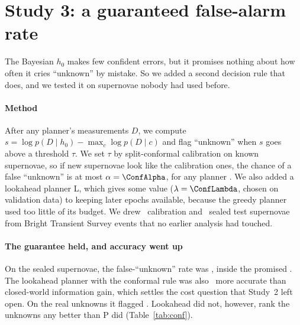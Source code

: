 \section{Study 3: a guaranteed false-alarm rate}\label{sec:conf}
The Bayesian $h_0$ makes few confident errors, but it promises nothing about how often it cries ``unknown'' by mistake. So we added a second decision rule that does, and we tested it on supernovae nobody had used before.

\paragraph{Method} After any planner's measurements $D$, we compute $s=\log p(D\mid h_0)-\max_c\log p(D\mid c)$ and flag ``unknown'' when $s$ goes above a threshold $\tau$. We set $\tau$ by split-conformal calibration on known supernovae, so if new supernovae look like the calibration ones, the chance of a false ``unknown'' is at most $\alpha=\ConfAlpha$, for any planner \citep{Vovk2005,Angelopoulos2023}. We also added a lookahead planner L, which gives some value ($\lambda=\ConfLambda$, chosen on validation data) to keeping later epochs available, because the greedy planner used too little of its budget. We drew \ConfNCal\ calibration and \ConfNFresh\ sealed test supernovae from Bright Transient Survey events that no earlier analysis had touched.

\begin{table}[!tbp]
\centering\scriptsize
\caption{Conformal open-set study, preregistered results per noise seed: estimate [95\% CI]; $^\times$ marks a criterion not met. Primary system: lookahead planner L with the conformal decision (C-L). $\Delta$: C-L minus closed-world EIG (B3), except HC6 (AUROC of $s$, L minus P). HC1 uses Clopper--Pearson intervals; HC2--HC4 and HC6 use the paired bootstrap.}
\label{tab:conf}

\end{table}

\paragraph{The guarantee held, and accuracy went up} On the sealed supernovae, the false-``unknown'' rate was \ConfFa, inside the promised \ConfAlphaPct. The lookahead planner with the conformal rule was also \ConfAccGain\ more accurate than closed-world information gain, which settles the cost question that Study~2 left open. On the real unknowns it flagged \ConfFlag. Lookahead did not, however, rank the unknowns any better than P did (Table~\ref{tab:conf}).

